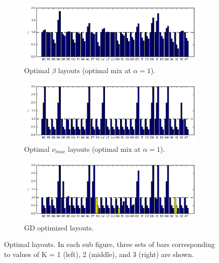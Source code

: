 \documentclass[a4paper, 5p, sort&compress]{elsarticle}%
\newcommand{\chromowidth}{1.00 \columnwidth}
\begin{document}

\begin{figure}[p]
  \centering
  \begin{subfigure}{2\columnwidth}
    \includegraphics[width = \chromowidth, center]{betaLayouts}
    \caption{Optimal $\beta$ layouts (optimal mix at $\alpha = 1$).}
    \label{fig:betaOpt}    
  \end{subfigure}
  \begin{subfigure}{2\columnwidth}
    \includegraphics[width = \chromowidth, center]{cfMaxLayouts}
    \caption{Optimal $\nu_{max}$ layouts (optimal mix at $\alpha = 1$).}
    \label{fig:cfMaxOpt}    
  \end{subfigure}
  \begin{subfigure}{2\columnwidth}
    \includegraphics[width = \chromowidth, center]{csLayouts}
    \caption{GD optimized layouts.}
    \label{fig:agdOpt}    
  \end{subfigure}
  \caption{Optimal layouts. In each sub figure, three sets of bars
    corresponding to values of K = 1 (left), 2 (middle), and 3 (right)
    are shown.}
  \label{fig:optLayouts}
\end{figure}
\end{document}
